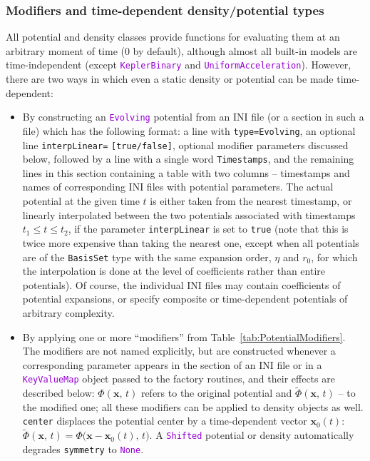 \documentclass[12pt]{article}
\newcommand{\ttt}[1]{\textcolor{darkviolet}{\texttt{#1}}}
\newcommand{\ppp}[1]{\textcolor{darkolive} {\texttt{#1}}}
\begin{document}
\subsubsection{Modifiers and time-dependent density/potential types}  \label{sec:PotentialModifiers}

All potential and density classes provide functions for evaluating them at an arbitrary moment of time (0 by default), although almost all built-in models are time-independent (except \ttt{KeplerBinary} and \ttt{UniformAcceleration}). However, there are two ways in which even a static density or potential can be made time-dependent:

\begin{itemize}
\item By constructing an \ttt{Evolving} potential from an INI file (or a section in such a file) which has the following format: a line with \ppp{type=Evolving}, an optional line \ppp{interpLinear=} \ppp{[true/false]}, optional modifier parameters discussed below, followed by a line with a single word \texttt{Timestamps}, and the remaining lines in this section containing a table with two columns -- timestamps and names of corresponding INI files with potential parameters. The actual potential at the given time $t$ is either taken from the nearest timestamp, or linearly interpolated between the two potentials associated with timestamps $t_1 \le t \le t_2$, if the parameter \ppp{interpLinear} is set to \texttt{true} (note that this is twice more expensive than taking the nearest one, except when all potentials are of the \ppp{BasisSet} type with the same expansion order, $\eta$ and $r_0$, for which the interpolation is done at the level of coefficients rather than entire potentials). Of course, the individual INI files may contain coefficients of potential expansions, or specify composite or time-dependent potentials of arbitrary complexity.
%
\item By applying one or more ``modifiers'' from Table~\ref{tab:PotentialModifiers}. The modifiers are not named explicitly, but are constructed whenever a corresponding parameter appears in the section of an INI file or in a \ttt{KeyValueMap} object passed to the factory routines, and their effects are described below: $\Phi(\boldsymbol x,\,t)$ refers to the original potential and $\widetilde\Phi(\boldsymbol x,\,t)$ -- to the modified one; all these modifiers can be applied to density objects as well.\\
%
\ppp{center} displaces the potential center by a time-dependent vector $\boldsymbol x_0(t)$: $\widetilde\Phi(\boldsymbol x,\,t) = \Phi\big( \boldsymbol x - \boldsymbol x_0(t),\,t\big)$. A \ttt{Shifted} potential or density automatically degrades \ppp{symmetry} to \ttt{None}.\\

\end{itemize}
\end{document}
